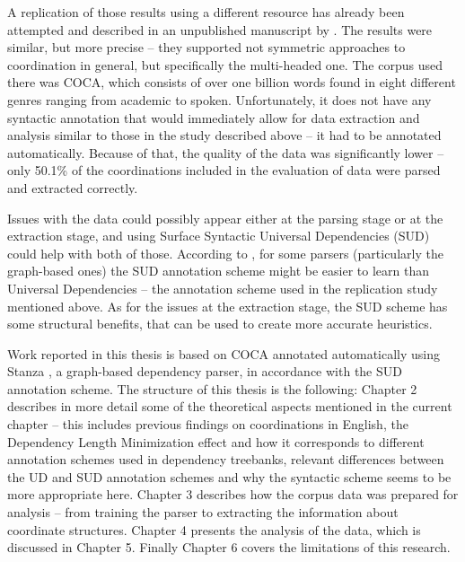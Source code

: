 A replication of those results using a different resource has already been attempted and described in an unpublished manuscript by \cite{prz:etal:24}. The results were similar, but more precise -- they supported not symmetric approaches to coordination in general, but specifically the multi-headed one. The corpus used there was COCA, which consists of over one billion words found in eight different genres ranging from academic to spoken. Unfortunately, it does not have any syntactic annotation that would immediately allow for data extraction and analysis similar to those in the study described above -- it had to be annotated automatically. Because of that, the quality of the data was significantly lower -- only 50.1\% of the coordinations included in the evaluation of data were parsed and extracted correctly.

Issues with the data could possibly appear either at the parsing stage or at the extraction stage, and using Surface Syntactic Universal Dependencies (SUD) could help with both of those. According to \cite{tuo:prz:lac:21}, for some parsers (particularly the graph-based ones) the SUD annotation scheme might be easier to learn than Universal Dependencies -- the annotation scheme used in the replication study mentioned above. As for the issues at the extraction stage, the SUD scheme has some structural benefits, that can be used to create more accurate heuristics.

Work reported in this thesis is based on COCA annotated automatically using Stanza \cite{qi2020stanza}, a graph-based dependency parser, in accordance with the SUD annotation scheme. The structure of this thesis is the following: Chapter 2 describes in more detail some of the theoretical aspects mentioned
in the current chapter -- this includes previous findings on coordinations in English, the Dependency Length Minimization effect and how it corresponds to different annotation schemes used in dependency treebanks, relevant differences between the UD and SUD annotation schemes and why the syntactic scheme seems to be more appropriate here. Chapter 3 describes how the corpus data was prepared for analysis -- from training the parser to extracting the information about coordinate structures. Chapter 4 presents the analysis of the data, which is discussed in Chapter 5. Finally Chapter 6 covers the limitations of this research.